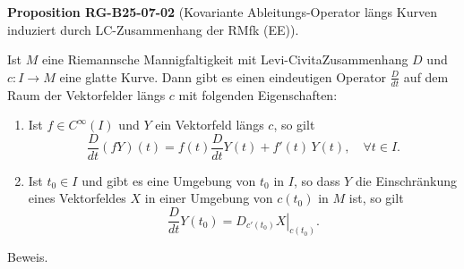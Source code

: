 \documentclass[10pt, letterpaper]{article}
\newcommand{\CustomHeading}[3]{%
  \par\medskip\noindent%
  \textbf{#1 #2} \textnormal{(#3)}.\enskip%
}
\newenvironment{PROP}[2]{\begin{unitbox}\CustomHeading{Proposition}{#1}{#2}}{\end{unitbox}}
\begin{document}
\begin{PROP}{RG-B25-07-02}{Kovariante Ableitungs-Operator längs Kurven induziert durch LC-Zusammenhang der RMfk (EE)}
Ist $M$ eine Riemannsche Mannigfaltigkeit mit Levi-CivitaZusammenhang $D$ und $c: I \rightarrow M$ eine glatte Kurve. Dann gibt es einen eindeutigen Operator $\frac{D}{d t}$ auf dem Raum der Vektorfelder längs $c$ mit folgenden Eigenschaften:
\begin{enumerate}
  \item Ist $f \in C^{\infty}(I)$ und $Y$ ein Vektorfeld längs $c$, so gilt
  \[
  \frac{D}{dt}(f Y)(t) = f(t) \frac{D}{dt} Y(t) + f'(t)\, Y(t), \quad \forall t \in I.
  \]
  
  \item Ist $t_0 \in I$ und gibt es eine Umgebung von $t_0$ in $I$, so dass $Y$ die Einschränkung eines Vektorfeldes $X$ in einer Umgebung von $c(t_0)$ in $M$ ist, so gilt
  \[
  \frac{D}{dt} Y(t_0) = \left. D_{c'(t_0)} X \right|_{c(t_0)}.
  \]
\end{enumerate}
\end{PROP}


Beweis. 
\end{document}
